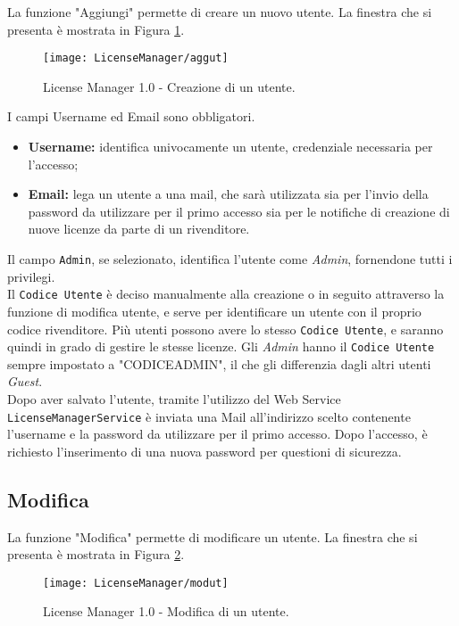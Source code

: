 La funzione "Aggiungi" permette di creare un nuovo utente. La finestra che si presenta è mostrata in Figura \ref{agg}.

\begin{figure}[!h] 
    \centering 
    \texttt{[image: LicenseManager/aggut]} 
    \caption{License Manager 1.0 - Creazione di un utente.}
\label{agg}

\end{figure}

I campi Username ed Email sono obbligatori.
\begin{itemize}
\item \textbf{Username:} identifica univocamente un utente, credenziale necessaria per l’accesso;
\item \textbf{Email:} lega un utente a una mail, che sarà utilizzata sia per l’invio della password da utilizzare per il primo accesso sia per le notifiche di creazione di nuove licenze da parte di un rivenditore.
\end{itemize}
Il campo \texttt{Admin}, se selezionato, identifica l’utente come \textit{Admin}, fornendone tutti i privilegi.\\
Il \texttt{Codice Utente} è deciso manualmente alla creazione o in seguito attraverso la funzione di modifica utente, e serve per identificare un utente con il proprio codice rivenditore. Più utenti possono avere lo stesso \texttt{Codice Utente}, e saranno quindi in grado di gestire le stesse licenze. Gli \textit{Admin} hanno il \texttt{Codice Utente} sempre impostato a "CODICEADMIN", il che gli differenzia dagli altri utenti \textit{Guest}.\\
Dopo aver salvato l’utente, tramite l'utilizzo del Web Service \texttt{LicenseManagerService} è inviata una Mail all’indirizzo scelto contenente l’username e la password da utilizzare per il primo accesso. Dopo l’accesso, è richiesto l’inserimento di una nuova password per questioni di sicurezza.


\subsection{Modifica}

La funzione "Modifica" permette di modificare un utente. La finestra che si presenta è mostrata in Figura \ref{mod}.

\begin{figure}[!h] 
    \centering 
    \texttt{[image: LicenseManager/modut]} 
    \caption{License Manager 1.0 - Modifica di un utente.}
\label{mod}

\end{figure}


